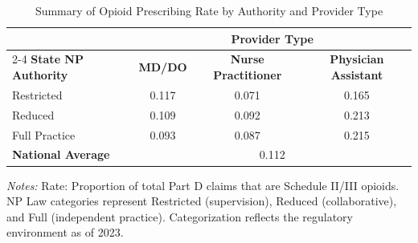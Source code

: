 \begin{table}[htbp]
    \centering
    \caption{Summary of Opioid Prescribing Rate by Authority and Provider Type}
    \label{tab:partd_opioid_rate}
    \vspace{0.2cm}
    \begin{tabular}{lccc}
        \toprule
        & \multicolumn{3}{c}{\textbf{Provider Type}} \\
        \cmidrule(lr){2-4}
        \textbf{State NP Authority} & \textbf{MD/DO} & \textbf{Nurse Practitioner} & \textbf{Physician Assistant} \\
        \midrule
        Restricted & 0.117 & 0.071 & 0.165 \\
        Reduced & 0.109 & 0.092 & 0.213 \\
        Full Practice & 0.093 & 0.087 & 0.215 \\
        \midrule
        \textbf{National Average} & \multicolumn{3}{c}{0.112} \\
        \bottomrule
    \end{tabular}
    \vspace{0.1cm}
    \begin{minipage}{0.85\textwidth}
        \footnotesize \textit{Notes:} Rate: Proportion of total Part D claims that are Schedule II/III opioids. NP Law categories represent Restricted (supervision), Reduced (collaborative), and Full (independent practice). Categorization reflects the regulatory environment as of 2023.
    \end{minipage}
\end{table}
